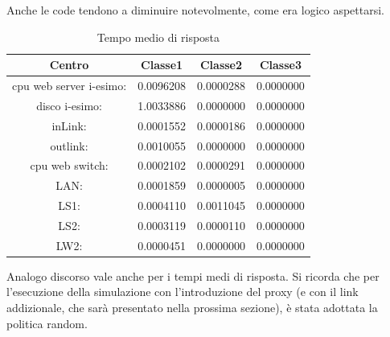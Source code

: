 Anche le code tendono a diminuire notevolmente, come era logico aspettarsi. 
\begin{table}[htbp]
\begin{center}
\begin{tabular}{|c|c|c|c|}
\hline
Centro &Classe1 &Classe2 &Classe3\\
\hline
\hline
 cpu web server i-esimo: 	&0.0096208	&0.0000288	&0.0000000\\
\hline
 disco i-esimo: 	&1.0033886	&0.0000000	&0.0000000\\
\hline
 inLink: 	&0.0001552	&0.0000186	&0.0000000\\
\hline
 outlink: 	&0.0010055	&0.0000000	&0.0000000\\
\hline
 cpu web switch: 	&0.0002102	&0.0000291	&0.0000000\\
\hline
 LAN: 	&0.0001859	&0.0000005	&0.0000000\\
\hline
 LS1: 	&0.0004110	&0.0011045	&0.0000000\\
\hline
 LS2: 	&0.0003119	&0.0000110	&0.0000000\\
\hline
 LW2: 	&0.0000451	&0.0000000	&0.0000000\\
\hline
\end{tabular}
\end{center}
\caption{Tempo medio di risposta}
\label{tempomediodirisposta}
\end{table}
Analogo discorso vale anche per i tempi medi di risposta. Si ricorda che per l'esecuzione della simulazione con l'introduzione del proxy (e con il link addizionale, che sarà presentato nella prossima  sezione), è stata adottata la politica random.

